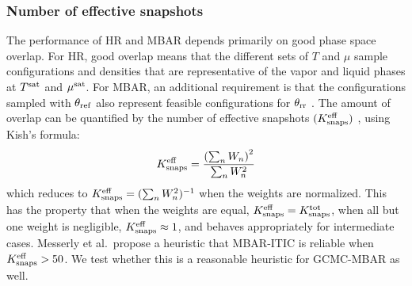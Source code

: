 \documentclass[journal=jced,manuscript=article]{achemso}
\begin{document}

\subsubsection{Number of effective snapshots} \label{sec: Keff}

The performance of HR and MBAR depends primarily on good phase space overlap. For HR, good overlap means that the different sets of $T$ and $\mu$ sample configurations and densities that are representative of the vapor and liquid phases at $T^{\rm sat}$ and $\mu^{\rm sat}$. For MBAR, an additional requirement is that the configurations sampled with $\theta_{\rm ref}$ also represent feasible configurations for $\theta_{\rm rr}$ \cite{naden:jctc:2016,Postdoc_1}. The amount of overlap can be quantified by the number of effective snapshots $(K^{\rm eff}_{\rm snaps})$ \cite{Dybeck2016}, using Kish's formula:
\begin{eqnarray} \label{Neff_lit}
K^{\rm eff}_{\rm snaps} = \frac{\left(\sum_n W_n\right)^2}{\sum_n W_n^2}
\end{eqnarray}
which reduces to $K^{\rm eff}_{\rm snaps}  = (\sum_n W_n^2)^{-1}$ when the weights are
normalized. This has the property that when the weights are equal,
$K^{\rm eff}_{\rm snaps}  = K^{\rm tot}_{\rm snaps} $, when all but one weight is negligible, $K^{\rm eff}_{\rm snaps}  \approx
1$, and behaves appropriately for intermediate cases. Messerly et al.~propose a heuristic that MBAR-ITIC is reliable when $K^{\rm eff}_{\rm snaps} > 50$. We test whether this is a reasonable heuristic for GCMC-MBAR as well. 
\end{document}
